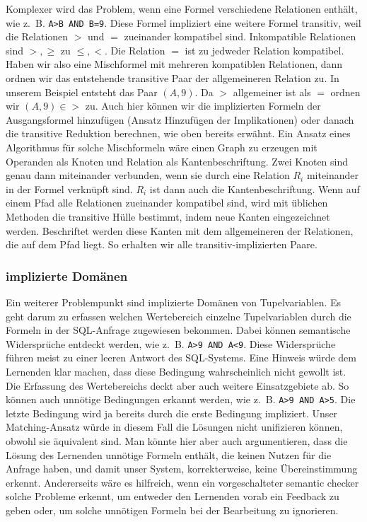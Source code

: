 Komplexer wird das Problem, wenn eine Formel verschiedene Relationen enthält, wie \mbox{z. B.} \verb|A>B AND B=9|. Diese Formel impliziert eine weitere Formel transitiv, weil die Relationen $>$ und $=$ zueinander kompatibel sind. Inkompatible Relationen sind $>,\geq$ zu $\leq,<$. Die Relation $=$ ist zu jedweder Relation kompatibel. Haben wir also eine Mischformel mit mehreren kompatiblen Relationen, dann ordnen wir das entstehende transitive Paar der allgemeineren Relation zu. In unserem Beispiel entsteht das Paar $(A,9)$. Da $>$ allgemeiner ist als $=$ ordnen wir $(A,9) \in >$ zu. Auch hier können wir die implizierten Formeln der Ausgangsformel hinzufügen (Ansatz Hinzufügen der Implikationen) oder danach die transitive Reduktion berechnen, wie oben bereits erwähnt. Ein Ansatz eines Algorithmus für solche Mischformeln wäre einen Graph zu erzeugen mit Operanden als Knoten und Relation als Kantenbeschriftung. Zwei Knoten sind genau dann miteinander verbunden, wenn sie durch eine Relation $R_i$ miteinander in der Formel verknüpft sind. $R_i$ ist dann auch die Kantenbeschriftung. Wenn auf einem Pfad alle Relationen zueinander kompatibel sind, wird mit üblichen Methoden die transitive Hülle bestimmt, indem neue Kanten eingezeichnet werden. Beschriftet werden diese Kanten mit dem allgemeineren der Relationen, die auf dem Pfad liegt. So erhalten wir alle transitiv-implizierten Paare.

\subsubsection{implizierte Domänen}

Ein weiterer Problempunkt sind implizierte Domänen von Tupelvariablen. Es geht darum zu erfassen welchen Wertebereich einzelne Tupelvariablen durch die Formeln in der SQL-Anfrage zugewiesen bekommen. Dabei können semantische Widersprüche entdeckt werden, wie \mbox{z. B.} \verb|A>9 AND A<9|. Diese Widersprüche führen meist zu einer leeren Antwort des SQL-Systems. Eine Hinweis würde dem Lernenden klar machen, dass diese Bedingung wahrscheinlich nicht gewollt ist. Die Erfassung des Wertebereichs deckt aber auch weitere Einsatzgebiete ab. So können auch unnötige Bedingungen erkannt werden, wie \mbox{z. B.} \verb|A>9 AND A>5|. Die letzte Bedingung wird ja bereits durch die erste Bedingung impliziert. Unser Matching-Ansatz würde in diesem Fall die Lösungen nicht unifizieren können, obwohl sie äquivalent sind. Man könnte hier aber auch argumentieren, dass die Lösung des Lernenden unnötige Formeln enthält, die keinen Nutzen für die Anfrage haben, und damit unser System, korrekterweise, keine Übereinstimmung erkennt. Andererseits wäre es hilfreich, wenn ein vorgeschalteter semantic checker solche Probleme erkennt, um entweder den Lernenden vorab ein Feedback zu geben oder, um solche unnötigen Formeln bei der Bearbeitung zu ignorieren. 


